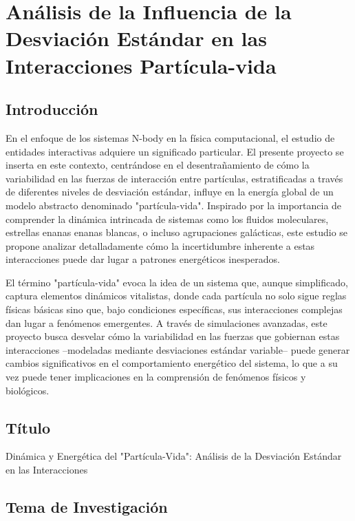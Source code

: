 \cfoot{\thepage}
\renewcommand{\headrulewidth}{1pt}
\renewcommand{\footrulewidth}{1pt}
\chapter{Análisis de la Influencia de la Desviación Estándar en las Interacciones Partícula-vida}

\section{Introducción}
En el enfoque de los sistemas N-body en la física computacional, el estudio de entidades interactivas adquiere un significado particular. El presente proyecto se inserta en este contexto, centrándose en el desentrañamiento de cómo la variabilidad en las fuerzas de interacción entre partículas, estratificadas a través de diferentes niveles de desviación estándar, influye en la energía global de un modelo abstracto denominado "partícula-vida". Inspirado por la importancia de comprender la dinámica intrincada de sistemas como los fluidos moleculares, estrellas enanas enanas blancas, o incluso agrupaciones galácticas, este estudio se propone analizar detalladamente cómo la incertidumbre inherente a estas interacciones puede dar lugar a patrones energéticos inesperados.

El término "partícula-vida" evoca la idea de un sistema que, aunque simplificado, captura elementos dinámicos vitalistas, donde cada partícula no solo sigue reglas físicas básicas sino que, bajo condiciones específicas, sus interacciones complejas dan lugar a fenómenos emergentes. A través de simulaciones avanzadas, este proyecto busca desvelar cómo la variabilidad en las fuerzas que gobiernan estas interacciones –modeladas mediante desviaciones estándar variable– puede generar cambios significativos en el comportamiento energético del sistema, lo que a su vez puede tener implicaciones en la comprensión de fenómenos físicos y biológicos.

\section{Título}
Dinámica y Energética del "Partícula-Vida": Análisis de la Desviación Estándar en las Interacciones

\section{Tema de Investigación}

